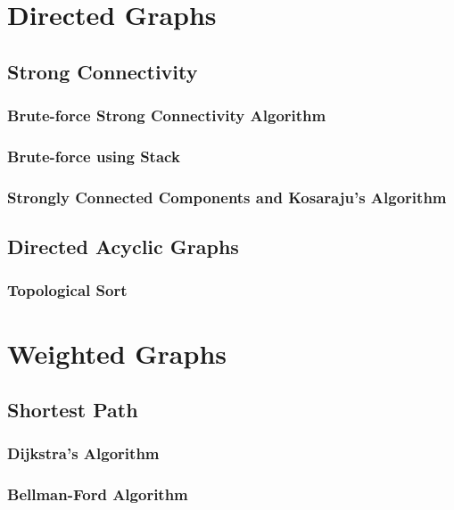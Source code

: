 \documentclass{report}
\begin{document}

\chapter{Directed Graphs}

\section{Strong Connectivity}

\subsection{Brute-force Strong Connectivity Algorithm}

\subsection{Brute-force using Stack}

\subsection{Strongly Connected Components and Kosaraju's Algorithm}

\section{Directed Acyclic Graphs}

\subsection{Topological Sort}


\chapter{Weighted Graphs}

\section{Shortest Path}

\subsection{Dijkstra's Algorithm}

\subsection{Bellman-Ford Algorithm}
\end{document}
